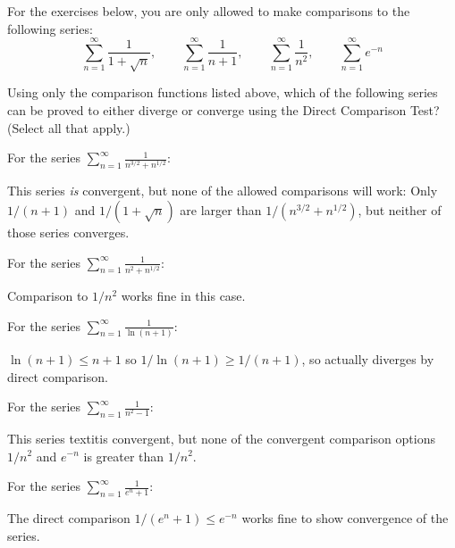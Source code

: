 \documentclass{ximera}
\begin{document}
For the exercises below, you are only allowed to make comparisons to the following series:
\[ \sum_{n=1}^\infty \frac{1}{1+\sqrt{n}}, \qquad \sum_{n=1}^\infty \frac{1}{n+1},  \qquad \sum_{n=1}^\infty \frac{1}{n^2}, \qquad \sum_{n=1}^\infty e^{-n} \]
\begin{exercise}
Using only the comparison functions listed above, which of the following series can be proved to either diverge or converge using the Direct Comparison Test? (Select all that apply.)
\begin{selectAll}
\end{selectAll}
\begin{feedback}
For the series {$\displaystyle \sum_{n=1}^\infty \frac{1}{n^{3/2}+n^{1/2}}$}:
\begin{expandable}
This series \textit{is} convergent, but none of the allowed comparisons will work: Only $1/(n+1)$ and $1/(1+\sqrt{n})$ are larger than $1/(n^{3/2}+n^{1/2})$, but neither of those series converges.
\end{expandable}

For the series {$\displaystyle \sum_{n=1}^\infty \frac{1}{n^2 + n^{1/2}}$}:
\begin{expandable}
Comparison to $1/n^2$ works fine in this case.
\end{expandable}

For the series {$\displaystyle \sum_{n=1}^\infty \frac{1}{\ln (n+1)}$}:
\begin{expandable}
$\ln (n+1) \leq n+1$ so $1/\ln (n+1) \geq 1/(n+1)$, so actually diverges by direct comparison.
\end{expandable}

For the series {$\displaystyle \sum_{n=1}^\infty \frac{1}{n^2-1}$}:
\begin{expandable}
This series textit{is} convergent, but none of the convergent comparison options $1/n^2$ and $e^{-n}$ is greater than $1/n^2$.
\end{expandable}

For the series {$\displaystyle \sum_{n=1}^\infty \frac{1}{e^n  + 1}$}:
\begin{expandable}
The direct comparison $1/(e^n + 1) \leq e^{-n}$ works fine to show convergence of the series.
\end{expandable}


\end{feedback}
\end{exercise}
\end{document}
